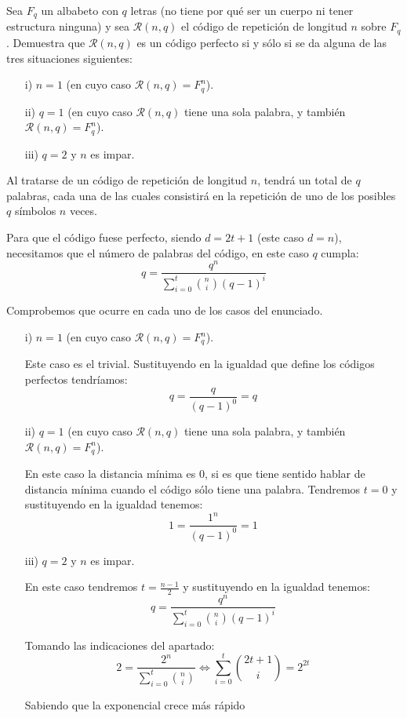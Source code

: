 \begin{problem}[11]
Sea $F_q$ un albabeto con $q$ letras (no tiene por qué ser un cuerpo ni tener estructura ninguna) y sea ${\mathcal R}(n,q)$ el código de repetición de longitud $n$ sobre $F_q$. Demuestra que ${\mathcal R}(n,q)$ es un código perfecto si y sólo si se da alguna de las tres situaciones siguientes:

\begin{enumerate}
\item[i)] $n=1$ (en cuyo caso ${\mathcal R}(n,q)=F_q^n$).
\item[ii)] $q=1$ (en cuyo caso ${\mathcal R}(n,q)$ tiene una sola palabra, y también ${\mathcal R}(n,q)=F_q^n$).
\item[iii)] $q=2$ y $n$ es impar.
\end{enumerate}
\solution


Al tratarse de un código de repetición de longitud $n$, tendrá un total de $q$ palabras, cada una de las cuales consistirá en la repetición de uno de los posibles $q$ símbolos $n$ veces.

Para que el código fuese perfecto, siendo $d=2t+1$ (este caso $d=n$), necesitamos que el número de palabras del código, en este caso $q$ cumpla:
\[q = \frac{q^n}{\sum_{i=0}^t{n \choose i}(q-1)^i}\]

Comprobemos que ocurre en cada uno de los casos del enunciado.

\begin{enumerate}
\item[i)] $n=1$ (en cuyo caso ${\mathcal R}(n,q)=F_q^n$).

Este caso es el trivial. Sustituyendo en la igualdad que define los códigos perfectos tendríamos:
\[q = \frac{q}{(q-1)^0}=q\]

\item[ii)] $q=1$ (en cuyo caso ${\mathcal R}(n,q)$ tiene una sola palabra, y también ${\mathcal R}(n,q)=F_q^n$).

En este caso la distancia mínima es 0, si es que tiene sentido hablar de distancia mínima cuando el código sólo tiene una palabra. Tendremos $t=0$ y sustituyendo en la igualdad tenemos:
\[1 = \frac{1^n}{(q-1)^0}=1\]

\item[iii)] $q=2$ y $n$ es impar.

En este caso tendremos $t=\frac{n-1}{2}$ y sustituyendo en la igualdad tenemos:
\[q = \frac{q^n}{\sum_{i=0}^t{n \choose i}(q-1)^i} \]

Tomando las indicaciones del apartado:
\[2 = \frac{2^n}{\sum_{i=0}^t{n \choose i}} \iff \sum_{i=0}^t{2t+1 \choose i} = 2^{2t}\]

Sabiendo que la exponencial crece más rápido
\end{enumerate}
\end{problem}


